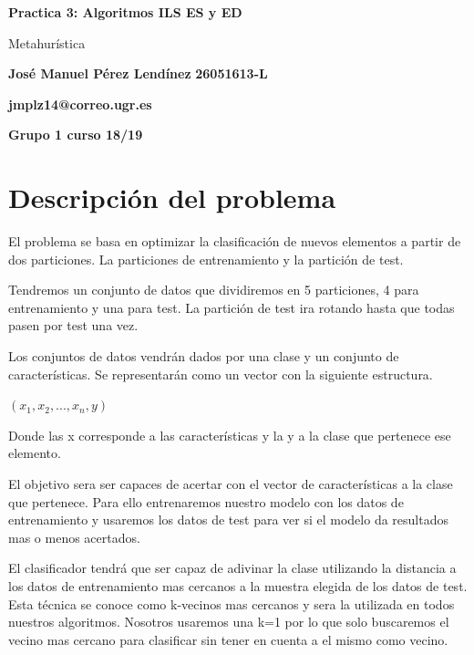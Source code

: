 \documentclass[titlepage]{article}
\begin{document}
	\begin{titlepage}
		\begin{center}
			\vspace*{1cm}
			\date{} %
			\Huge
			\textbf{Practica 3: Algoritmos ILS ES y ED}
			
			\vspace{0.5cm}
			\LARGE
			Metahurística
			
			\vspace{1.5cm}
			
			\textbf{José Manuel Pérez Lendínez}
			\textbf{26051613-L}\newline
			
			\textbf{jmplz14@correo.ugr.es}		

					
			\textbf{Grupo 1 curso 18/19}
			

			
		\end{center}
	\newpage
	\tableofcontents
	\newpage
	\end{titlepage}
	\section{Descripción del problema}
	 El problema se basa en optimizar la clasificación de nuevos elementos a partir de dos particiones. La particiones de entrenamiento y la partición de test.
	 
	Tendremos un conjunto de datos que dividiremos en 5 particiones, 4 para entrenamiento y una para test. La partición de test ira rotando hasta que todas pasen por test una vez. 
	
	Los conjuntos de datos vendrán dados por una clase y un conjunto de características. Se representarán como un vector con la siguiente estructura.
	\begin{center}
		$(x_1, x_2, ... , x_n, y)$
	\end{center}

	Donde las x corresponde a las características y la y a la clase que pertenece ese elemento.
	
	El objetivo sera ser capaces de acertar con el vector de características a la clase que pertenece. Para ello entrenaremos nuestro modelo con los datos de entrenamiento y usaremos los datos de test para ver si el modelo da resultados mas o menos acertados.
	
	El clasificador tendrá que ser capaz de adivinar la clase utilizando la distancia a los datos de entrenamiento mas cercanos a la muestra elegida de los datos de test. Esta técnica se conoce como k-vecinos mas cercanos y sera la utilizada en todos nuestros algoritmos. Nosotros usaremos una k=1 por lo que solo buscaremos el vecino mas cercano para clasificar sin tener en cuenta a el mismo como vecino.
	
\end{document}
